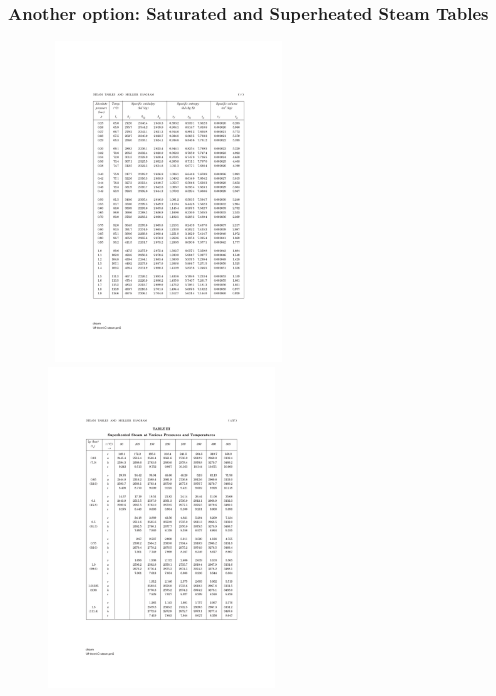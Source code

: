 \documentclass[10pt,compress]{beamer}
\begin{document}
\begin{frame}
  \frametitle{Another option: Saturated and Superheated Steam Tables}
   \begin{figure}%
   \vbox{
      \hbox{\hspace{-1.cm}
      \includegraphics[width=8.cm,height=8.5cm,clip]{./Pics/Sample_SteamTablePg}
      \hspace{-2cm}
      \includegraphics[width=8.cm,height=8.5cm,clip]{./Pics/Sample_SteamTablePg2}}}
   \end{figure}
\end{frame}


 
\end{document}
